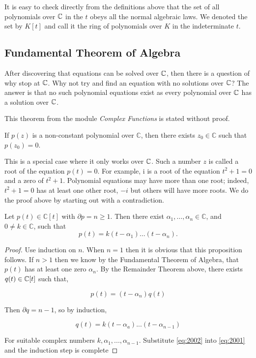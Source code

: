It is easy to check directly from the definitions above that the set of all polynomials over $\mathbb C$ in the $t$ obeys all the normal algebraic laws. We denoted the set by $K[t]$ and call it the ring of polynomials over $K$ in the indeterminate $t$.

\subsection{Fundamental Theorem of Algebra} 

After discovering that equations can be solved over $\mathbb C$, then there is a question of why stop at $\mathbb C$. Why not try and find an equation with no solutions over $\mathbb C$? The answer is that no such polynomial equations exist as every polynomial over $\mathbb C$ has a solution over $\mathbb C$.

This theorem from the module \textit{Complex Functions} is stated without proof. 

\begin{theorem} \label{thm:fundamental-algebra}
    If $p(z)$ is a non-constant polynomial over $\mathbb{C}$, then there exists $z_0 \in \mathbb{C}$ such that $p\left(z_0\right)=0$.
\end{theorem}

This is a special case where it only works over $\mathbb C$. Such a number $z$ is called a root of the equation $p(t)=0$. For example, $\mathrm{i}$ is a root of the equation $t^2+1=0$ and a zero of $t^2+1$. Polynomial equations may have more than one root; indeed, $t^2+1=0$ has at least one other root, $-i$ but others will have more roots. We do the proof above by starting out with a contradiction.

\begin{proposition}
    Let $p(t) \in \mathbb{C}[t]$ with $\partial p=n \geq 1$. Then there exist $\alpha_1, \ldots, \alpha_n \in \mathbb{C}$, and $0 \neq k \in \mathbb{C}$, such that
    $$
    p(t)=k\left(t-\alpha_1\right) \ldots\left(t-\alpha_n\right).
    $$
\end{proposition}

\begin{proof}
    Use induction on $n$. When $n = 1$ then it is obvious that this proposition follows. If $n > 1$ then we know by the Fundamental Theorem of Algebra, that $p(t)$ has at least one zero $\alpha_n$. By the Remainder Theorem above, there exists $q(t) \in \mathbb C[t]$ such that,

\begin{equation} \label{eq:2001}
    p(t) = (t-\alpha_n) q(t)
\end{equation}
    
    Then $\partial q = n - 1$, so by induction,

\begin{equation} \label{eq:2002}
    q(t) = k(t-\alpha_a)...(t-\alpha_{n-1})
\end{equation}     
    
    For suitable complex numbers $k,\alpha_1,...,\alpha_{n-1}$. Substitute \ref{eq:2002} into \ref{eq:2001} and the induction step is complete
\end{proof}

